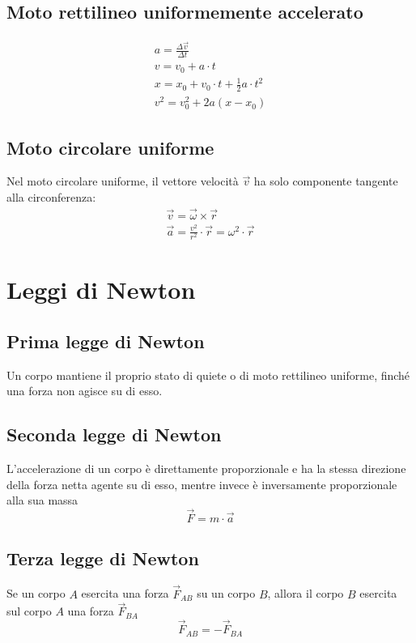 \subsection{Moto rettilineo uniformemente accelerato}
\begin{displaymath}\begin{aligned}
    a = \frac{\Delta \vec{v}}{\Delta t}\\
    v = v_0 + a \cdot t\\
    x = x_0 + v_0 \cdot t + \frac{1}{2} a\cdot t^2\\
    v^2 = v_0^2 +2a(x-x_0)
\end{aligned}\end{displaymath}

\subsection{Moto circolare uniforme}
Nel moto circolare uniforme, il vettore velocità $\vec{v}$ ha solo componente tangente alla circonferenza:
\begin{displaymath}\begin{aligned}
    \vec{v} = \vec{\omega} \times \vec{r}\\
    \vec{a} = \frac{v^2}{r^2} \cdot \vec{r} = \omega^2 \cdot \vec{r} 
\end{aligned}\end{displaymath}	

\section{Leggi di Newton}
\subsection{Prima legge di Newton}
Un corpo mantiene il proprio stato di quiete o di moto rettilineo uniforme, finché una forza non agisce su di esso.

\subsection{Seconda legge di Newton}
L'accelerazione di un corpo è direttamente proporzionale e ha la stessa direzione della forza netta agente su di esso, mentre invece è inversamente proporzionale alla sua massa
\begin{displaymath}
	\vec{F} = m \cdot \vec{a}
\end{displaymath}

\subsection{Terza legge di Newton}
Se un corpo $A$ esercita una forza $\vec{F}_{AB}$ su un corpo $B$, allora il corpo $B$ esercita sul corpo $A$ una forza $\vec{F}_{BA}$
\begin{displaymath}
  	\vec{F}_{AB} = -\vec{F}_{BA}
\end{displaymath}

